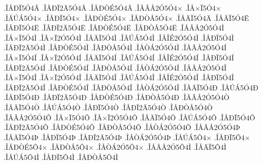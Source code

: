 {.^^ce^^c5^^d0^^cf5^^d34^^c2
.^^ce^^c5^^d0^^cf2^^c45^^d34^^c2
.^^ce^^c5^^d0^^d2^^c95^^d34^^c2
.^^ce^^c5^^c2^^c52^^d35^^d34^^d7
.^^ce^^c5^^d7^^cf5^^d34^^d7
.^^ce^^c5^^da^^c15^^d34^^d7
.^^ce^^c5^^d0^^cf5^^d34^^d7
.^^ce^^c5^^d0^^d2^^c95^^d34^^d7
.^^ce^^c5^^d0^^d2^^c55^^d34^^d7
.^^ce^^c5^^c4^^cf5^^d34^^c4
.^^ce^^c5^^c4^^cf5^^d34^^cb
.^^ce^^c5^^d0^^cf5^^d34^^cb
.^^ce^^c5^^d0^^cf2^^c45^^d34^^cb
.^^ce^^c5^^d0^^d2^^c95^^d34^^cb
.^^ce^^c5^^d0^^d2^^c55^^d34^^cb
.^^ce^^c5^^c2^^c52^^d35^^d34^^cc
.^^ce^^c5^^d7^^cf5^^d34^^cc
.^^ce^^c5^^d7^^cf2^^d35^^d34^^cc
.^^ce^^c5^^c4^^cf5^^d34^^cc
.^^ce^^c5^^da^^c15^^d34^^cc
.^^ce^^c5^^ce^^c92^^d35^^d34^^cc
.^^ce^^c5^^d0^^cf5^^d34^^cc
.^^ce^^c5^^d0^^cf2^^c45^^d34^^cc
.^^ce^^c5^^d0^^d2^^c95^^d34^^cc
.^^ce^^c5^^d0^^d2^^c55^^d34^^cc
.^^ce^^c5^^d2^^c12^^d35^^d34^^cc
.^^ce^^c5^^c2^^c52^^d35^^d34^^cd
.^^ce^^c5^^d7^^cf5^^d34^^cd
.^^ce^^c5^^d7^^cf2^^d35^^d34^^cd
.^^ce^^c5^^c4^^cf5^^d34^^cd
.^^ce^^c5^^da^^c15^^d34^^cd
.^^ce^^c5^^ce^^c92^^d35^^d34^^cd
.^^ce^^c5^^d0^^cf5^^d34^^cd
.^^ce^^c5^^d0^^cf2^^c45^^d34^^cd
.^^ce^^c5^^d0^^d2^^c95^^d34^^cd
.^^ce^^c5^^d0^^d2^^c55^^d34^^cd
.^^ce^^c5^^d2^^c12^^d35^^d34^^cd
.^^ce^^c5^^c2^^c52^^d35^^d34^^ce
.^^ce^^c5^^d7^^cf5^^d34^^ce
.^^ce^^c5^^d7^^cf2^^d35^^d34^^ce
.^^ce^^c5^^c4^^cf5^^d34^^ce
.^^ce^^c5^^da^^c15^^d34^^ce
.^^ce^^c5^^ce^^c92^^d35^^d34^^ce
.^^ce^^c5^^d0^^cf5^^d34^^ce
.^^ce^^c5^^d0^^cf2^^c45^^d34^^ce
.^^ce^^c5^^d0^^d2^^c95^^d34^^ce
.^^ce^^c5^^d0^^d2^^c55^^d34^^ce
.^^ce^^c5^^d2^^c12^^d35^^d34^^ce
.^^ce^^c5^^c4^^cf5^^d34^^d0
.^^ce^^c5^^da^^c15^^d34^^d0
.^^ce^^c5^^d0^^cf5^^d34^^d0
.^^ce^^c5^^d0^^cf2^^c45^^d34^^d0
.^^ce^^c5^^d0^^d2^^c95^^d34^^d0
.^^ce^^c5^^d0^^d2^^c55^^d34^^d0
.^^ce^^c5^^c2^^c52^^d35^^d34^^d2
.^^ce^^c5^^c4^^cf5^^d34^^d2
.^^ce^^c5^^da^^c15^^d34^^d2
.^^ce^^c5^^d0^^cf5^^d34^^d2
.^^ce^^c5^^d0^^cf2^^c45^^d34^^d2
.^^ce^^c5^^d0^^d2^^c55^^d34^^d2
.^^ce^^c5^^c2^^c52^^d35^^d34^^d4
.^^ce^^c5^^d7^^cf5^^d34^^d4
.^^ce^^c5^^d7^^cf2^^d35^^d34^^d4
.^^ce^^c5^^c4^^cf5^^d34^^d4
.^^ce^^c5^^da^^c15^^d34^^d4
.^^ce^^c5^^d0^^cf5^^d34^^d4
.^^ce^^c5^^d0^^cf2^^c45^^d34^^d4
.^^ce^^c5^^d0^^d2^^c95^^d34^^d4
.^^ce^^c5^^d0^^d2^^c55^^d34^^d4
.^^ce^^c5^^d2^^c12^^d35^^d34^^d4
.^^ce^^c5^^c2^^c52^^d35^^d34^^de
.^^ce^^c5^^c4^^cf5^^d34^^de
.^^ce^^c5^^d0^^cf5^^d34^^de
.^^ce^^c5^^d0^^cf2^^c45^^d34^^de
.^^ce^^c5^^d2^^c12^^d35^^d34^^de
.^^ce^^c5^^da^^c15^^d44^^d7
.^^ce^^c5^^d0^^cf5^^d44^^d7
.^^ce^^c5^^d0^^d2^^c95^^d44^^d7
.^^ce^^c5^^d0^^d2^^c55^^d44^^d7
.^^ce^^c5^^d2^^c12^^d35^^d44^^d7
.^^ce^^c5^^c2^^c52^^d35^^d44^^cc
.^^ce^^c5^^c4^^cf5^^d44^^cc
.^^ce^^c5^^da^^c15^^d44^^cc
.^^ce^^c5^^d0^^cf5^^d44^^cc
.^^ce^^c5^^d0^^d2^^c55^^d44^^cc
}
